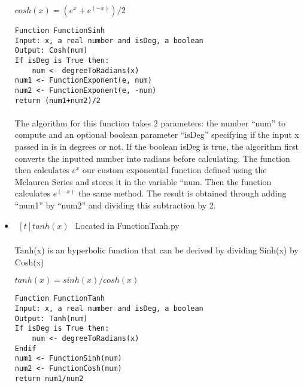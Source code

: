\begin{itemize}
            \begin{center}
                $cosh(x) = (e^x + e^(-x))/2$
            \end{center}

            \begin{lstlisting}
Function FunctionSinh
Input: x, a real number and isDeg, a boolean
Output: Cosh(num)
If isDeg is True then:
    num <- degreeToRadians(x)
num1 <- FunctionExponent(e, num)
num2 <- FunctionExponent(e, -num)
return (num1+num2)/2
            \end{lstlisting}

            \paragraph{}
            The algorithm for this function takes 2 parameters: the number “num” to compute and an optional boolean parameter “isDeg” specifying if the input x passed in is in degrees or not. If the boolean isDeg is true, the algorithm first converts the inputted number into radians before calculating. The function then calculates $e^x$ our custom exponential function defined using the Mclauren Series and stores it in the variable “num. Then the function calculates $e^(-x)$ the same method. The result is obtained through adding “num1” by “num2” and dividing this subtraction by 2.

        \item $\begin{aligned}[t]
            tanh(x)
        \end{aligned}$
            Located in FunctionTanh.py

            \paragraph{}
            Tanh(x) is an hyperbolic function that can be derived by dividing Sinh(x) by Cosh(x)

            \begin{center}
                $tanh(x) = sinh(x)/cosh(x)$
            \end{center}

            \begin{lstlisting}
Function FunctionTanh
Input: x, a real number and isDeg, a boolean
Output: Tanh(num)
If isDeg is True then:
    num <- degreeToRadians(x)
Endif
num1 <- FunctionSinh(num)
num2 <- FunctionCosh(num)
return num1/num2
            \end{lstlisting}


\end{itemize}
